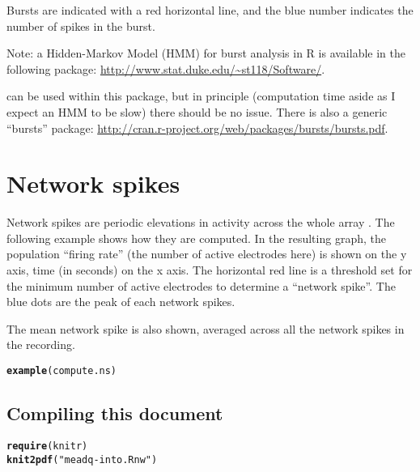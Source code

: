 \documentclass{article}\usepackage[]{graphicx}\usepackage[]{color}
\makeatletter
\newcommand{\hlstr}[1]{\textcolor[rgb]{0.192,0.494,0.8}{#1}}%
\newcommand{\hlstd}[1]{\textcolor[rgb]{0.345,0.345,0.345}{#1}}%
\newcommand{\hlkwd}[1]{\textcolor[rgb]{0.737,0.353,0.396}{\textbf{#1}}}%
\newenvironment{kframe}{%
 \def\at@end@of@kframe{}%
 \ifinner\ifhmode%
  \def\at@end@of@kframe{\end{minipage}}%
  \begin{minipage}{\columnwidth}%
 \fi\fi%
 \def\FrameCommand##1{\hskip\@totalleftmargin \hskip-\fboxsep
 \colorbox{shadecolor}{##1}\hskip-\fboxsep
     \hskip-\linewidth \hskip-\@totalleftmargin \hskip\columnwidth}%
 \MakeFramed {\advance\hsize-\width
   \@totalleftmargin\z@ \linewidth\hsize
   \@setminipage}}%
 {\par\unskip\endMakeFramed%
 \at@end@of@kframe}
\newenvironment{knitrout}{}{} %
\makeatother
\begin{document}
Bursts are indicated with a red horizontal line, and the blue number
indicates the number of spikes in the burst.


Note: a Hidden-Markov Model (HMM) for burst analysis in R \citep{Tokdar2010}
is available in the following package:
\url{http://www.stat.duke.edu/~st118/Software/}.

can be used within this package, but in principle (computation time
aside as I expect an HMM to be slow) there should be no issue.  There
is also a generic ``bursts'' package:
\url{http://cran.r-project.org/web/packages/bursts/bursts.pdf}.



\section*{Network spikes}

Network spikes are periodic elevations in activity across the whole
array \citep{Eytan2006}.  The following example shows how they are computed.
In the resulting graph, the population ``firing rate'' (the number of
active electrodes here) is shown on the y axis, time (in seconds) on
the x axis.  The horizontal red line is a threshold set for the
minimum number of active electrodes to determine a ``network spike''.
The blue dots are the peak of each network spikes.

The mean network spike is also shown, averaged across all the network
spikes in the recording.

\begin{knitrout}
\color{fgcolor}\begin{kframe}
\begin{alltt}
\hlkwd{example}\hlstd{(compute.ns)}
\end{alltt}


{\ttfamily\noindent\color{warningcolor}{\#\# Warning: no help found for 'compute.ns'}}\end{kframe}
\end{knitrout}





\subsection*{Compiling this document}

\begin{knitrout}
\color{fgcolor}\begin{kframe}
\begin{alltt}
\hlkwd{require}\hlstd{(knitr)}
\hlkwd{knit2pdf}\hlstd{(}\hlstr{"meadq-into.Rnw"}\hlstd{)}
\end{alltt}
\end{kframe}
\end{knitrout}
\end{document}
